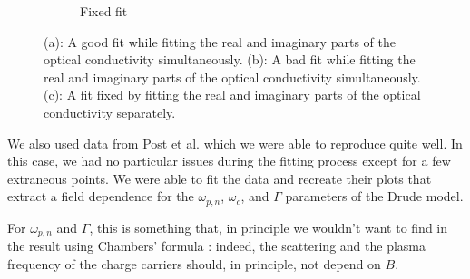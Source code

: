 \begin{figure}
\begin{subfigure}{0.49\textwidth}
        \caption{Fixed fit}
        \label{fig:drude_fit_bad}
    \end{subfigure}
    \caption{(a): A good fit while fitting the real and imaginary parts of the optical conductivity
    simultaneously. (b): A bad fit while fitting the real and imaginary parts of the optical
    conductivity simultaneously. (c): A fit fixed by fitting the real and imaginary parts of the
    optical conductivity separately.}
\end{figure}

We also used data from Post et al. which we were able to reproduce quite well. 
In this case, we had no particular issues during the fitting process except for a few extraneous points. 
We were able to fit the data and recreate their plots that extract a field dependence for the $\omega_{p,n}$, $\omega_c$, and $\Gamma$ parameters of the Drude model.

For $\omega_{p,n}$ and $\Gamma$, this is something that, in principle we wouldn't want to find in the result using Chambers' formula : 
indeed, the scattering and the plasma frequency of the charge carriers should, 
in principle, not depend on $B$.

